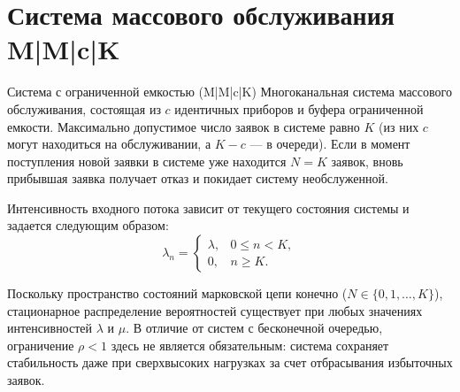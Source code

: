 \section{Система массового обслуживания M|M|c|K}

\begin{definition}{Система с ограниченной емкостью (M|M|c|K)}
Многоканальная система массового обслуживания, состоящая из $c$ идентичных приборов и буфера ограниченной емкости. Максимально допустимое число заявок в системе равно $K$ (из них $c$ могут находиться на обслуживании, а $K-c$ — в очереди). Если в момент поступления новой заявки в системе уже находится $N = K$ заявок, вновь прибывшая заявка получает отказ и покидает систему необслуженной.
\end{definition}

Интенсивность входного потока зависит от текущего состояния системы и задается следующим образом:
$$
\lambda_n = 
\begin{cases} 
\lambda, & 0 \le n < K, \\ 
0, & n \ge K.
\end{cases}
$$

Поскольку пространство состояний марковской цепи конечно ($N \in \{0, 1, \dots, K\}$), стационарное распределение вероятностей существует при любых значениях интенсивностей $\lambda$ и $\mu$. В отличие от систем с бесконечной очередью, ограничение $\rho < 1$ здесь не является обязательным: система сохраняет стабильность даже при сверхвысоких нагрузках за счет отбрасывания избыточных заявок.


